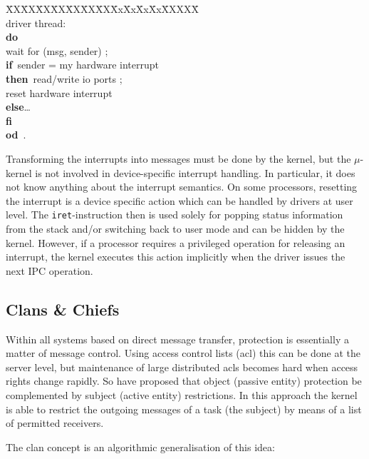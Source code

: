 \documentclass[a4paper,11pt,twoside,dvips]{book}
\newcommand{\micro}{$\mu$}
\newcommand{\stdtabs}{\sf\=XX\=XX\=XX\=XX\=XX\=XX\=XX\=Xx\=Xx\=Xx\=Xx\=XXXXX\=\kill\+\+\\}
\newcommand{\alg}[1] 
 {{\noindent 
 \begin{minipage}{\textwidth} 
 \begin{tabbing}\stdtabs\+ #1 \end{tabbing} 
 \end{minipage}}}
\newcommand{\DO}{{\bf do}\ \+}
\newcommand{\OD}{{\<\bf od}\ \-}
\newcommand{\IF}{{\bf if}\ \+}
\newcommand{\FI}{{\<\<\<\bf fi}\ \-\-\-}
\newcommand{\THEN}{{\bf then}\ \>\>\+\+}
\newcommand{\ELSE}{{\<\<\bf else}\>\>}
\begin{document}
{\footnotesize 
\alg{driver thread:\\ 
      \DO \\ 
         wait for (msg, sender) ; \\ 
         \IF sender = my hardware interrupt \\ 
           \THEN read/write io ports ; \\ 
                 reset hardware interrupt \\ 
           \ELSE \dots \\ 
         \FI \\ 
       \OD .\\ 
       } 
} 
 
Transforming the interrupts into messages must be done by the kernel,
but the \micro-kernel is not involved in device-specific interrupt handling.
In
particular, it does not know anything about the interrupt semantics. On some
processors, resetting the interrupt is a device specific action which can be
handled by drivers at user level. The {\tt iret}-instruction then is
used solely for popping status information from the stack and/or switching
back to user mode and can be hidden by the kernel. However, if a processor
requires a privileged operation for releasing an interrupt, the kernel
executes this action
implicitly when the driver issues the next IPC operation. 
 
 
 
\subsection{Clans \& Chiefs} 
 
Within all systems based on direct message transfer,
protection is essentially a matter of message control. Using access control lists (acl) this
can be done at the server level, but maintenance of large distributed acls becomes hard when access
rights change rapidly. So \cite{haertig:birlixsec} have
proposed that object (passive entity) protection be complemented
by subject (active entity) restrictions. In this approach the kernel is able to restrict the
outgoing messages of a task (the subject) by means of a list of permitted receivers. 
 
The clan concept \cite{clans} is an algorithmic
generalisation of this idea: 
 
\end{document}
